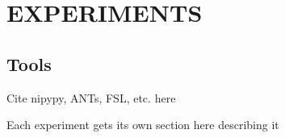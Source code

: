 \chapter{EXPERIMENTS}

\section{Tools}

Cite nipypy, ANTs, FSL, etc. here

Each experiment gets its own section here describing it
